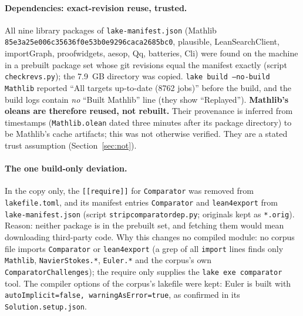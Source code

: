 \documentclass[10pt]{article}
\newcommand{\lean}[1]{\texttt{#1}}
\renewcommand{\_}{\textunderscore\allowbreak}
\begin{document}
\paragraph{Dependencies: exact-revision reuse, trusted.} All nine library packages of \texttt{lake-manifest.json} (Mathlib \texttt{85e3a25e006c35636f0e53b0e9296caca2685bc0}, plausible, LeanSearchClient, importGraph, proofwidgets,
aesop, Qq, batteries, Cli) were found on the machine in a prebuilt package set whose git revisions equal the manifest exactly (script \texttt{check\_revs.py}); the 7.9~GB directory was copied. \lean{lake build --no-build Mathlib}
reported ``All targets up-to-date (8762 jobs)'' before the build, and the build logs contain \emph{no} ``Built Mathlib'' line (they show ``Replayed''). \textbf{Mathlib's oleans are therefore reused, not rebuilt.} Their provenance is inferred from
timestamps (\texttt{Mathlib.olean} dated three minutes after its package directory) to be Mathlib's cache artifacts; this was not otherwise verified. They are a stated trust assumption (Section~\ref{sec:not}).

\paragraph{The one build-only deviation.} In the copy only, the \lean{[[require]]} for \texttt{Comparator} was removed from \texttt{lakefile.toml}, and its manifest entries \texttt{Comparator} and \texttt{lean4export} from
\texttt{lake-manifest.json} (script \texttt{strip\_comparator\_dep.py}; originals kept as \texttt{*.orig}). Reason: neither package is in the prebuilt set, and fetching them would mean downloading third-party code. Why this changes no compiled module: no
corpus file imports \texttt{Comparator} or \texttt{lean4export} (a grep of all \lean{import} lines finds only \texttt{Mathlib}, \texttt{NavierStokes.*}, \texttt{Euler.*} and the corpus's own \texttt{ComparatorChallenges}); the require only supplies the
\texttt{lake exe comparator} tool. The compiler options of the corpus's lakefile were kept: Euler is built with \lean{autoImplicit=false, warningAsError=true}, as confirmed in its \texttt{Solution.setup.json}.
\end{document}
